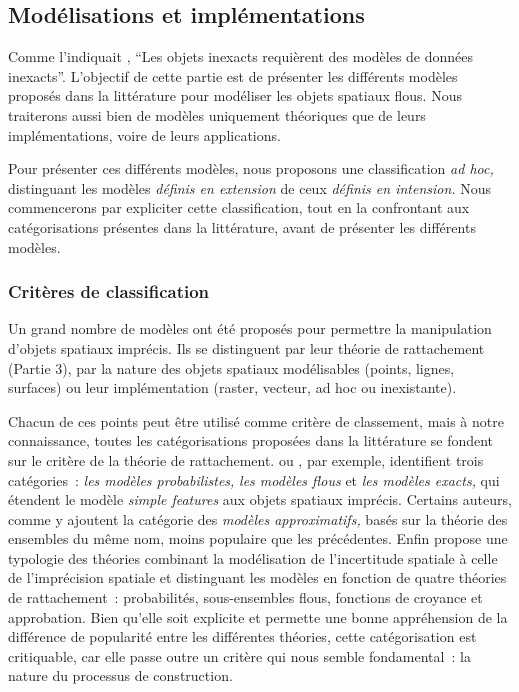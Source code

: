 
\subsection{Modélisations et implémentations}


Comme l’indiquait \textcite[p. 15]{Burrough1996}, \enquote{Les objets
  inexacts requièrent des modèles de données inexacts}. L’objectif de
cette partie est de présenter les différents modèles proposés dans la
littérature pour modéliser les objets spatiaux flous. Nous traiterons
aussi bien de modèles uniquement théoriques que de leurs
implémentations, voire de leurs applications.

Pour présenter ces différents modèles, nous proposons une
classification \emph{ad hoc,} distinguant les modèles \emph{définis en
  extension} de ceux \emph{définis en intension.} Nous commencerons
par expliciter cette classification, tout en la confrontant aux
catégorisations présentes dans la littérature, avant de présenter les
différents modèles.

\subsubsection{Critères de classification}

Un grand nombre de modèles ont été proposés pour permettre la
manipulation d’objets spatiaux imprécis. Ils se distinguent par leur
théorie de rattachement (Partie 3), par la nature des objets spatiaux
modélisables (\eg points, lignes, surfaces) ou leur implémentation
(\eg raster, vecteur, ad hoc ou inexistante).

Chacun de ces points peut être utilisé comme critère de classement,
mais à notre connaissance, toutes les catégorisations proposées dans
la littérature se fondent sur le critère de la théorie de
rattachement. \textcite{Clementini2008} ou \textcite{Erwig1997}, par
exemple, identifient trois catégories : \emph{les modèles
  probabilistes,} \emph{les modèles flous} et \emph{les modèles
  exacts,} qui étendent le modèle \emph{simple features} aux objets
spatiaux imprécis. Certains auteurs, comme
\textcite{Schneider2001,Schneider2008,Carniel2016} y ajoutent la
catégorie des \emph{modèles approximatifs,} basés sur la théorie des
ensembles du même nom, moins populaire que les précédentes. Enfin
\textcite{Fisher2003,Fisher2005,Fisher2006} propose une typologie des
théories combinant la modélisation de l’incertitude spatiale à celle
de l’imprécision spatiale et distinguant les modèles en fonction de
quatre théories de rattachement : probabilités, sous-ensembles flous,
fonctions de croyance et approbation. Bien qu’elle soit explicite et
permette une bonne appréhension de la différence de popularité entre
les différentes théories, cette catégorisation est critiquable, car
elle passe outre un critère qui nous semble fondamental : la nature du
processus de construction.

